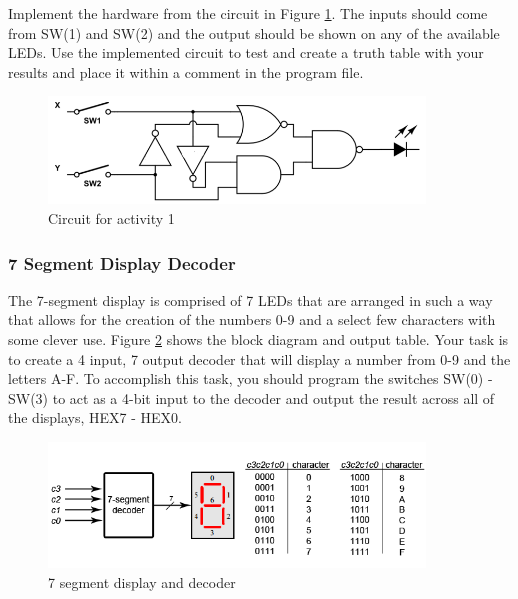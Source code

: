 Implement the hardware from the circuit in Figure \ref{fig:circuit1}. The inputs should come from SW(1) and SW(2) and the output should be shown on any of the available LEDs. Use the implemented circuit to test and create a truth table with your results and place it within a comment in the program file.

\begin{figure}[H]
	\centering
	\includegraphics[width=100mm]{Lab1/figures/circuit1.png}
	\caption{Circuit for activity 1}
	\label{fig:circuit1}
\end{figure}

\subsubsection{7 Segment Display Decoder}

The 7-segment display is comprised of 7 LEDs that are arranged in such a way that allows for the creation of the numbers 0-9 and a select few characters with some clever use. Figure \ref{fig:7seg} shows the block diagram and output table. Your task is to create a 4 input, 7 output decoder that will display a number from 0-9 and the letters A-F. To accomplish this task, you should program the switches SW(0) - SW(3) to act as a 4-bit input to the decoder and output the result across all of the displays, HEX7 - HEX0.

\begin{figure}[H]
	\centering
	\includegraphics[width=100mm]{Lab1/figures/7seg.png}
	\caption{7 segment display and decoder}
	\label{fig:7seg}
\end{figure}

